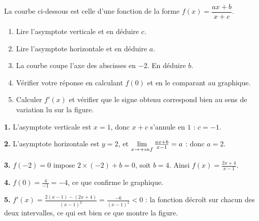 \begin{jecherche}
La courbe ci-dessous est celle d'une fonction de la forme
$f(x) = \dfrac{ax+b}{x+c}$.

\begin{center}
\end{center}

\begin{enumerate}[label=\textbf{\arabic*.}, leftmargin=*, itemsep=0.3em]
  \item Lire l'asymptote verticale et en déduire $c$.
  \item Lire l'asymptote horizontale et en déduire $a$.
  \item La courbe coupe l'axe des abscisses en $-2$. En déduire $b$.
  \item Vérifier votre réponse en calculant $f(0)$ et en le comparant au
        graphique.
  \item Calculer $f'(x)$ et vérifier que le signe obtenu correspond bien au
        sens de variation lu sur la figure.
\end{enumerate}
\end{jecherche}

\begin{corrige}
\textbf{1.} L'asymptote verticale est $x = 1$, donc $x+c$ s'annule en $1$ :
$c = -1$.

\textbf{2.} L'asymptote horizontale est $y = 2$, et
$\limpinf \frac{ax+b}{x-1} = a$ : donc $a = 2$.

\textbf{3.} $f(-2) = 0$ impose $2\times(-2)+b = 0$, soit $b = 4$. Ainsi
$f(x) = \frac{2x+4}{x-1}$.

\textbf{4.} $f(0) = \frac{4}{-1} = -4$, ce que confirme le graphique.

\textbf{5.} $f'(x) = \frac{2(x-1)-(2x+4)}{(x-1)^{2}} = \frac{-6}{(x-1)^{2}}
< 0$ : la fonction décroît sur chacun des deux intervalles, ce qui est bien
ce que montre la figure.
\end{corrige}

